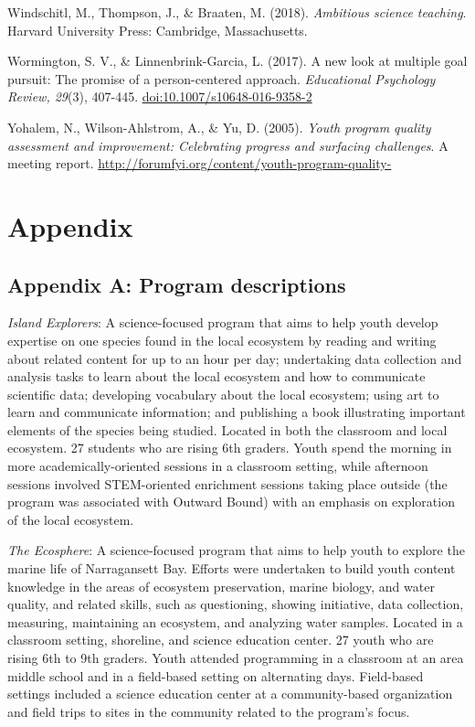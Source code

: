 \documentclass[]{msu-thesis}
\theoremstyle{definition}
\theoremstyle{definition}
\theoremstyle{definition}
\theoremstyle{remark}
\begin{document}
Windschitl, M., Thompson, J., \& Braaten, M. (2018). \emph{Ambitious
science teaching}. Harvard University Press: Cambridge, Massachusetts.

Wormington, S. V., \& Linnenbrink-Garcia, L. (2017). A new look at
multiple goal pursuit: The promise of a person-centered approach.
\emph{Educational Psychology Review, 29}(3), 407-445.
\url{doi:10.1007/s10648-016-9358-2}

Yohalem, N., Wilson-Ahlstrom, A., \& Yu, D. (2005). \emph{Youth program
quality assessment and improvement: Celebrating progress and surfacing
challenges}. A meeting report.
\url{http://forumfyi.org/content/youth-program-quality-}

\chapter{Appendix}\label{appendix}

\setlength{\parindent}{0in} \setlength{\leftskip}{0in}
\setlength{\parskip}{8pt} \noindent

\section{Appendix A: Program
descriptions}\label{appendix-a-program-descriptions}

\emph{Island Explorers}: A science-focused program that aims to help
youth develop expertise on one species found in the local ecosystem by
reading and writing about related content for up to an hour per day;
undertaking data collection and analysis tasks to learn about the local
ecosystem and how to communicate scientific data; developing vocabulary
about the local ecosystem; using art to learn and communicate
information; and publishing a book illustrating important elements of
the species being studied. Located in both the classroom and local
ecosystem. 27 students who are rising 6th graders. Youth spend the
morning in more academically-oriented sessions in a classroom setting,
while afternoon sessions involved STEM-oriented enrichment sessions
taking place outside (the program was associated with Outward Bound)
with an emphasis on exploration of the local ecosystem.

\emph{The Ecosphere}: A science-focused program that aims to help youth
to explore the marine life of Narragansett Bay. Efforts were undertaken
to build youth content knowledge in the areas of ecosystem preservation,
marine biology, and water quality, and related skills, such as
questioning, showing initiative, data collection, measuring, maintaining
an ecosystem, and analyzing water samples. Located in a classroom
setting, shoreline, and science education center. 27 youth who are
rising 6th to 9th graders. Youth attended programming in a classroom at
an area middle school and in a field-based setting on alternating days.
Field-based settings included a science education center at a
community-based organization and field trips to sites in the community
related to the program's focus.
\end{document}
